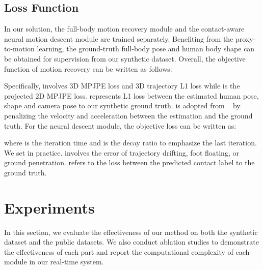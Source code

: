 \documentclass[10pt,twocolumn,letterpaper]{article}
\begin{document}
\subsection{Loss Function}
\label{sec:loss_function}
In our solution, the full-body motion recovery module and the contact-aware neural motion descent module are trained separately.
Benefiting from the proxy-to-motion learning, the ground-truth full-body pose  and human body shape  can be obtained for supervision from our synthetic dataset.
Overall, the objective function of motion recovery can be written as follows:


Specifically,  involves 3D MPJPE loss and 3D trajectory L1 loss while  is the projected 2D MPJPE loss.
 represents L1 loss between the estimated human pose, shape and camera pose to our synthetic ground truth.
 is adopted from ~\cite{zeng2021smoothnet} by penalizing the velocity and acceleration between the estimation and the ground truth.
For the neural descent module, the objective loss can be written as:

where  is the iteration time and  is the decay ratio to emphasize the last iteration.
We set  in practice.
 involves the error of trajectory drifting, foot floating, or ground penetration.  refers to the loss between the predicted contact label to the ground truth.




 \section{Experiments}
In this section, we evaluate the effectiveness of our method on both the synthetic dataset and the public datasets.
We also conduct ablation studies to demonstrate the effectiveness of each part and report the computational complexity of each module in our real-time system.
\end{document}
